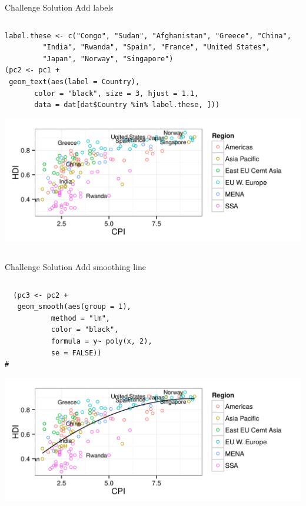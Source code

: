 \documentclass[table,smaller]{beamer}
\begin{document}
\begin{frame}[fragile,label=sec-8-4]{Challenge Solution}
 Add labels

\begin{columns}  \begin{block}{}

\begin{verbatim}
label.these <- c("Congo", "Sudan", "Afghanistan", "Greece", "China",
		 "India", "Rwanda", "Spain", "France", "United States",
		 "Japan", "Norway", "Singapore")
(pc2 <- pc1 +
 geom_text(aes(label = Country),
	   color = "black", size = 3, hjust = 1.1,
	   data = dat[dat$Country %in% label.these, ]))
\end{verbatim}

\includegraphics[width=.9\linewidth]{images/econScatter2.png}

\end{block} \end{columns}
\end{frame}

\begin{frame}[fragile,label=sec-8-5]{Challenge Solution}
 Add smoothing line

\begin{columns}  \begin{block}{}

\begin{verbatim}
  (pc3 <- pc2 +
   geom_smooth(aes(group = 1),
	       method = "lm",
	       color = "black",
	       formula = y~ poly(x, 2),
	       se = FALSE))
#
\end{verbatim}

\includegraphics[width=.9\linewidth]{images/econScatter3.png}

\end{block} \end{columns}
\end{frame}
\end{document}
